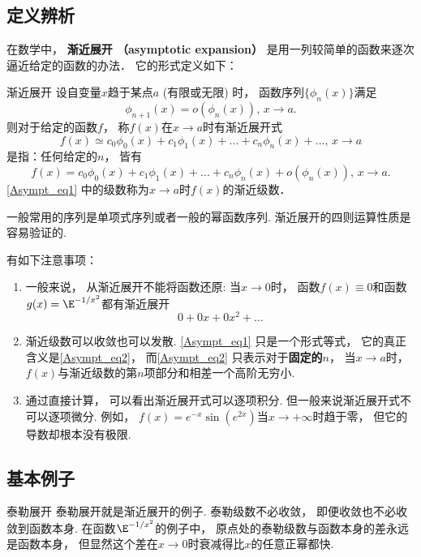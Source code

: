 
\subsection{定义辨析}
在数学中， \textbf{渐近展开 （asymptotic expansion）} 是用一列较简单的函数来逐次逼近给定的函数的办法． 它的形式定义如下：

\begin{definition}{渐近展开}
设自变量$x$趋于某点$a$ (有限或无限) 时， 函数序列$\{\phi_{n}(x)\}$满足
$$
\phi_{n+1}(x)=o(\phi_n(x)),\,x\to a.
$$
则对于给定的函数$f$， 称$f(x)$在$x\to a$时有渐近展开式
\begin{equation}\label{Asympt_eq1}
f(x)\simeq c_0\phi_0(x)+c_1\phi_1(x)+...+c_n\phi_n(x)+...,\,x\to a
\end{equation}
是指：任何给定的$n$， 皆有
\begin{equation}\label{Asympt_eq2}
f(x)=c_0\phi_0(x)+c_1\phi_1(x)+...+c_n\phi_n(x)+o(\phi_n(x)),\,x\to a.
\end{equation}
\autoref{Asympt_eq1} 中的级数称为$x\to a$时$f(x)$的渐近级数．
\end{definition}

一般常用的序列是单项式序列或者一般的幂函数序列. 渐近展开的四则运算性质是容易验证的.

有如下注意事项：
\begin{enumerate}
\item 一般来说， 从渐近展开不能将函数还原: 当$x\to0$时， 函数$f(x)\equiv 0$和函数$g(x)=\E^{-1/x^2}$都有渐近展开
$$
0+0x+0x^2+...
$$

\item 渐近级数可以收敛也可以发散. \autoref{Asympt_eq1} 只是一个形式等式， 它的真正含义是\autoref{Asympt_eq2}，  而\autoref{Asympt_eq2} 只表示对于\textbf{固定的$n$}， 当$x\to a$时， $f(x)$与渐近级数的第$n$项部分和相差一个高阶无穷小. 

\item 通过直接计算， 可以看出渐近展开式可以逐项积分. 但一般来说渐近展开式不可以逐项微分. 例如， $f(x)=e^{-x}\sin(e^{2x})$当$x\to+\infty$时趋于零， 但它的导数却根本没有极限.
\end{enumerate}

\subsection{基本例子}
\begin{example}{泰勒展开}
泰勒展开就是渐近展开的例子. 泰勒级数不必收敛， 即便收敛也不必收敛到函数本身. 在函数$\E^{-1/x^2}$的例子中， 原点处的泰勒级数与函数本身的差永远是函数本身， 但显然这个差在$x\to0$时衰减得比$x$的任意正幂都快.
\end{example}

